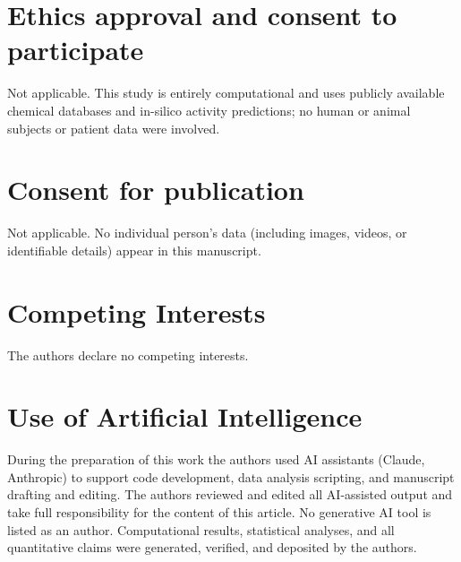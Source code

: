 \documentclass[11pt,a4paper]{article}
\begin{document}
\section*{Ethics approval and consent to participate}

Not applicable. This study is entirely computational and uses publicly available chemical databases and in-silico activity predictions; no human or animal subjects or patient data were involved.

\section*{Consent for publication}

Not applicable. No individual person's data (including images, videos, or identifiable details) appear in this manuscript.

\section*{Competing Interests}

The authors declare no competing interests.

\section*{Use of Artificial Intelligence}

During the preparation of this work the authors used AI assistants (Claude, Anthropic) to support code development, data analysis scripting, and manuscript 
drafting and editing. The authors reviewed and edited all AI-assisted output and take full responsibility for the content of this article. No generative AI tool 
is listed as an author. Computational results, statistical analyses, and all quantitative claims were generated, verified, and deposited by the authors.




\end{document}

